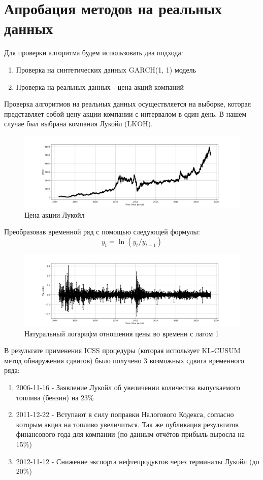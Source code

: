 \documentclass[a4paper,14pt,russian]{extarticle}
\begin{document}
	\section{\label{sec:sec3}Апробация методов на реальных данных}
	Для проверки алгоритма будем использовать два подхода:
	\begin{enumerate}
		\item Проверка на синтетических данных GARCH(1, 1) модель
		\item Проверка на реальных данных - цена акций компаний
	\end{enumerate}
	\par
	Проверка алгоритмов на реальных данных осуществляется на выборке, которая представляет собой цену акции компании с интервалом в один день. В нашем случае был выбрана компания Лукойл (LKOH).
	\begin{figure}[H]
		\includegraphics[width=\linewidth]{source_ts_LKOH.png}
		\caption{\label{fig:fig1} Цена акции Лукойл}
	\end{figure}
	Преобразовав временной ряд с помощью следующей формулы:
	\begin{equation}
		y_t = \ln(y_t / y_{t-1})
	\end{equation}
	\begin{figure}[H]
		\includegraphics[width=\linewidth]{source_ln_ts_LKOH.png}
		\caption{\label{fig:fig2} Натуральный логарифм отношения цены во времени с лагом 1}
	\end{figure}
	В результате применения ICSS процедуры (которая использует KL-CUSUM метод обнаружения сдвигов) было получено 3 возможных сдвига временного ряда:
	\begin{enumerate}
		\item 2006-11-16 - Заявление Лукойл об увеличении количества выпускаемого топлива (бензин) на 23\%
		\item 2011-12-22 - Вступают в силу поправки Налогового Кодекса, согласно которым акциз на топливо увеличиться. Так же публикация результатов финансового года для компании (по данным отчётов прибыль выросла на 15\%)
		\item 2012-11-12 - Снижение экспорта нефтепродуктов через терминалы Лукойл (до 20\%)
	\end{enumerate}
\end{document}
